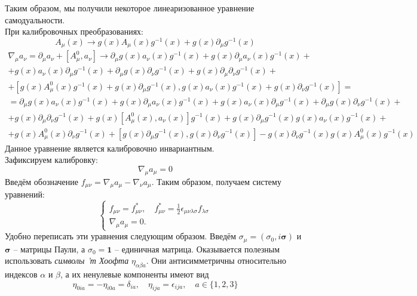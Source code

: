 \documentclass[12pt]{article}
\theoremstyle{definition}
\begin{document}
Таким образом, мы получили некоторое линеаризованное уравнение самодуальности.\\
При калибровочных преобразованиях:
\begin{equation}
    A_\mu(x)\rightarrow g(x)A_\mu(x)g^{-1}(x)+g(x)\partial_\mu g^{-1}(x)
\end{equation}
\begin{multline}
    \nabla_\mu a_\nu=\partial_\mu a_\nu+[A_{\mu}^0,a_\nu]\rightarrow\partial_\mu g(x)a_\nu(x)g^{-1}(x)+g(x)\partial_\mu a_\nu(x)g^{-1}(x)+\\+g(x)a_\nu(x)\partial_\mu g^{-1}(x)+\partial_\mu g(x)\partial_\nu g^{-1}(x)+g(x)\partial_\mu\partial_\nu g^{-1}(x)+\\+[g(x)A^0_\mu(x)g^{-1}(x)+g(x)\partial_\mu g^{-1}(x),g(x)a_\nu(x)g^{-1}(x)+g(x)\partial_\nu g^{-1}(x)]=\\=\partial_\mu g(x)a_\nu(x)g^{-1}(x)+g(x)\partial_\mu a_\nu(x)g^{-1}(x)+g(x)a_\nu(x)\partial_\mu g^{-1}(x)+\partial_\mu g(x)\partial_\nu g^{-1}(x)+\\
    +g(x)\partial_\mu\partial_\nu g^{-1}(x)+g(x)[A^0_\mu(x),a_{\nu}(x)]g^{-1}(x)+g(x)\partial_\mu g^{-1}(x)g(x)a_\nu(x)g^{-1}(x)+\\+g(x)A^0_\mu(x)\partial_\nu g^{-1}(x)+[g(x)\partial_\mu g^{-1}(x),g(x)\partial_\nu g^{-1}(x)]-g(x)\partial_\nu g^{-1}(x)g(x)A^0_\mu(x)g^{-1}(x)
\end{multline}
Данное уравнение является калибровочно инвариантным.\\
Зафиксируем калибровку:
\begin{equation}
    \nabla_\mu a_\mu=0
\end{equation}
Введём обозначение $f_{\mu\nu}=\nabla_\mu a_\mu-\nabla_\nu a_\mu$. Таким образом, получаем систему уравнений:
\begin{equation}\label{eq41}
    \begin{cases}
        f_{\mu\nu}=f^*_{\mu\nu},\quad f^*_{\mu\nu}=\frac{1}{2}\epsilon_{\mu\nu\lambda\sigma}f_{\lambda\sigma}\\
        \nabla_\mu a_\mu=0.
    \end{cases}
\end{equation}
Удобно переписать эти уравнения следующим образом. Введём $\sigma_\mu=(\sigma_0,i\bm{\sigma})$ и $\bm{\sigma}$ -- матрицы Паули, а $\sigma_0=\bm{1}$ -- единичная матрица. Оказывается полезным использовать \textit{символы 'т Хоофта} $\eta_{\alpha\beta a}$. Они антисимметричны относительно индексов $\alpha$ и $\beta$, а их ненулевые компоненты имеют вид
\begin{equation}
    \eta_{0ia}=-\eta_{i0a}=\delta_{ia},\quad\eta_{ija}=\epsilon_{ija},\quad a\in\{1,2,3\}
\end{equation}
\end{document}
